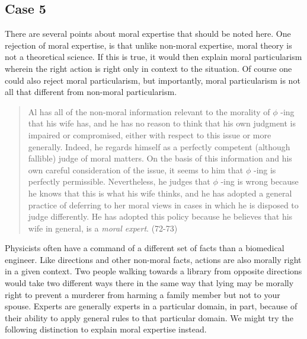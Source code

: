 \documentclass[phdthesis,12pt,final]{wuthesis}
\theoremstyle{definition}
\theoremstyle{definition}
\theoremstyle{definition}
\theoremstyle{definition}
\theoremstyle{remark}
\begin{document}
\subsection*{Case 5}\label{case-5}

There are several points about moral expertise that should be noted here. One rejection of moral expertise, is that unlike non-moral expertise, moral theory is not a theoretical science. If this is true, it would then explain moral particularism wherein the right action is right only in context to the situation. Of course one could also reject moral particularism, but importantly, moral particularism is not all that different from non-moral particularism.

\begin{quote}
Al has all of the non-moral information relevant to the morality of \(\phi\) -ing that his wife has, and he has no reason to think that his own judgment is impaired or compromised, either with respect to this issue or more generally. Indeed, he regards himself as a perfectly competent (although fallible) judge of moral matters. On the basis of this information and his own careful consideration of the issue, it seems to him that \(\phi\) -ing is perfectly permissible. Nevertheless, he judges that \(\phi\) -ing is wrong because he knows that this is what his wife thinks, and he has adopted a general practice of deferring to her moral views in cases in which he is disposed to judge differently. He has adopted this policy because he believes that his wife in general, is a \emph{moral expert}. (72-73)
\end{quote}

Physicists often have a command of a different set of facts than a biomedical engineer. Like directions and other non-moral facts, actions are also morally right in a given context. Two people walking towards a library from opposite directions would take two different ways there in the same way that lying may be morally right to prevent a murderer from harming a family member but not to your spouse. Experts are generally experts in a particular domain, in part, because of their ability to apply general rules to that particular domain. We might try the following distinction to explain moral expertise instead.

\begin{Shaded}
\begin{Highlighting}[]

\end{Highlighting}
\end{Shaded}
\end{document}
